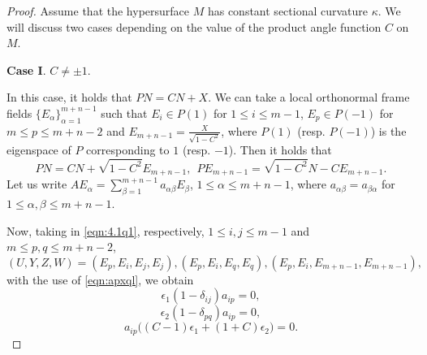 \documentclass[reqno]{amsart}%
\theoremstyle{definition}
\numberwithin{equation}{section}
\begin{document}
\begin{proof}
	
Assume that the hypersurface $M$ has constant sectional curvature $\kappa$. We will discuss two cases depending on the value of the product angle function $C$ on $M$.

{\bf Case I}. $C\neq\pm1$.

In this case,  it holds that $PN=CN+X$. 
We can take a local orthonormal frame fields $\{E_\alpha\}_{\alpha=1}^{m+n-1}$ 
such that $E_i\in P(1)$ for $1\leq i\leq m-1$, $E_p\in P(-1)$ for $m\leq p\leq m+n-2$ and  $E_{m+n-1}=\tfrac{X}{\sqrt{1-C^2}}$, where $P(1)$ (resp. $P(-1)$) is the eigenspace of $P$ corresponding to $1$ (resp. $-1$). Then it holds that 
%
\begin{equation}\label{eqn:4.1}
	PN=CN+\sqrt{1-C^2}E_{m+n-1},\ \ PE_{m+n-1}=\sqrt{1-C^2}N-CE_{m+n-1}.
\end{equation}
Let us write $AE_{\alpha}=\sum_{\beta=1}^{m+n-1}a_{\alpha\beta}E_\beta$, $1\leq \alpha\leq m+n-1$, where $a_{\alpha\beta}=a_{\beta\alpha}$ for
$1\leq \alpha,\beta\leq m+n-1$. %


Now, taking in \eqref{eqn:4.1q1}, respectively, $1\leq i, j\leq m-1$ and $m\leq p,q\leq m+n-2$,
%
$$
(U,Y,Z,W)=(E_p,E_i,E_j,E_j), (E_p,E_i,E_q,E_q), (E_p,E_i,E_{m+n-1},E_{m+n-1}),
$$
with the use of \eqref{eqn:apxql}, we obtain 
\begin{equation}\label{eqn:ap1}
\epsilon_1(1-\delta_{ij})a_{ip}=0,
\end{equation}
\begin{equation}\label{eqn:ap2}
	\epsilon_2(1-\delta_{pq})a_{ip}=0,
\end{equation}
\begin{equation}\label{eqn:ap3}
a_{ip}\big(( C-1)\epsilon_1 +(1+C)\epsilon_2\big)=0.
\end{equation}


\end{proof}
\end{document}
